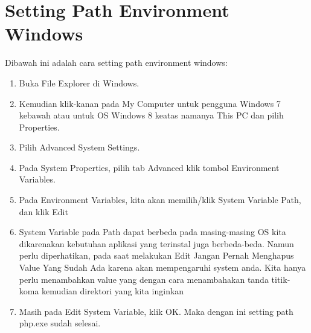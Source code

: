 \section {Setting Path Environment Windows}

Dibawah ini adalah cara setting path environment windows:
\begin{enumerate}[1.]
  \item Buka File Explorer di Windows.
  \item Kemudian klik-kanan pada My Computer untuk pengguna Windows 7 kebawah atau untuk OS Windows 8 keatas namanya This PC dan pilih Properties.
  \item Pilih Advanced System Settings.
  \item Pada System Properties, pilih tab Advanced klik tombol Environment Variables.
  \item Pada Environment Variables, kita akan memilih/klik System Variable Path, dan klik Edit
  \item System Variable pada Path dapat berbeda pada masing-masing OS kita dikarenakan kebutuhan aplikasi yang terinstal juga berbeda-beda. Namun perlu diperhatikan, pada saat melakukan Edit Jangan Pernah Menghapus Value Yang Sudah Ada karena akan mempengaruhi system anda. Kita hanya perlu menambahkan value yang dengan cara menambahakan tanda titik-koma kemudian direktori yang kita inginkan
  \item Masih pada Edit System Variable, klik OK. Maka dengan ini setting path php.exe sudah selesai.
\end{enumerate}









